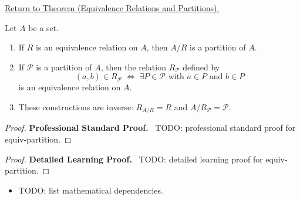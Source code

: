 \newpage
{}
\label{prf:equiv-partition}

\begin{remark*}[Return]
\hyperref[thm:equiv-partition]{Return to Theorem (Equivalence Relations and Partitions).}
\end{remark*}

\begin{theorem*}
Let $A$ be a set.
\begin{enumerate}[label=(\roman*)]
\item If $R$ is an equivalence relation on $A$, then $A/R$ is a partition of $A$.
\item If $\mathcal{P}$ is a partition of $A$, then the relation
$R_{\mathcal{P}}$ defined by
\[
(a,b) \in R_{\mathcal{P}} \;\Longleftrightarrow\;
\exists P \in \mathcal{P} \text{ with } a \in P \text{ and } b \in P
\]
is an equivalence relation on $A$.
\item These constructions are inverse: $R_{A/R} = R$ and $A/R_{\mathcal{P}} = \mathcal{P}$.
\end{enumerate}
\end{theorem*}

\begin{proof}
\textbf{Professional Standard Proof.}~
TODO: professional standard proof for equiv-partition.
\end{proof}

\begin{proof}
\textbf{Detailed Learning Proof.}~
TODO: detailed learning proof for equiv-partition.
\end{proof}

\begin{remark*}
\end{remark*}

\begin{dependencies}
\begin{itemize}
  \item TODO: list mathematical dependencies.
\end{itemize}
\end{dependencies}

\clearpage
